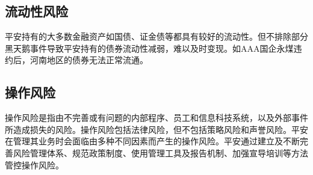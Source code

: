 \documentclass[11pt]{ctexart}
\begin{document}
\subsection{流动性风险}
\label{sec:orgf776237}
平安持有的大多数金融资产如国债、证金债等都具有较好的流动性。但不排除部分黑天鹅事件导致平安持有的债券流动性减弱，难以及时变现。如AAA国企永煤违约后，河南地区的债券无法正常流通。
\subsection{操作风险}
\label{sec:org1f9cf42}
操作风险是指由不完善或有问题的内部程序、员工和信息科技系统，以及外部事件所造成损失的风险。操作风险包括法律风险，但不包括策略风险和声誉风险。平安在管理其业务时会面临由多种不同因素而产生的操作风险。平安通过建立及不断完善风险管理体系、规范政策制度、使用管理工具及报告机制、加强宣导培训等方法管控操作风险。
\end{document}
